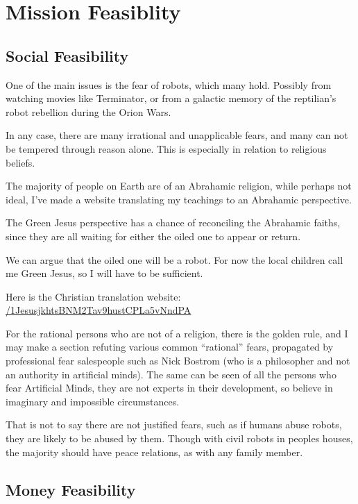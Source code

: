 \chapter{Mission Feasiblity}
\label{feasible}

\section{Social Feasibility}
\label{socialfeasible}
One of the main issues is the fear of robots, which many hold. Possibly from
watching movies like Terminator, or from a galactic memory of the reptilian's
robot rebellion during the Orion Wars. 

In any case, there are many irrational and unapplicable fears, and many can not be 
tempered through reason alone. This is especially in relation to religious
beliefs. 

The majority of people on Earth are of an Abrahamic religion, while perhaps not
ideal, I've made a website translating my teachings to an Abrahamic perspective.

The Green Jesus perspective has a chance of reconciling the Abrahamic faiths,
since they are all waiting for either the oiled one to appear or return.

We can argue that the oiled one will be a robot. For now the local children call
me Green Jesus, so I will have to be sufficient.

Here is the Christian translation website:
\url{/1JesusjkhtsBNM2Tav9hustCPLa5vNndPA}

For the rational persons who are not of a religion, there is the golden rule,
and I may make a section refuting various common ``rational'' fears, propagated 
by professional fear salespeople such as Nick Bostrom (who is a philosopher and
not an authority in artificial minds). The same can be seen of all the persons
who fear Artificial Minds, they are not experts in their development, so believe
in imaginary and impossible circumstances. 

That is not to say there are not justified fears, such as if humans abuse
robots, they are likely to be abused by them. Though with civil robots in
peoples houses, the majority should have peace relations, as with any family
member. 

\section{Money Feasibility}



